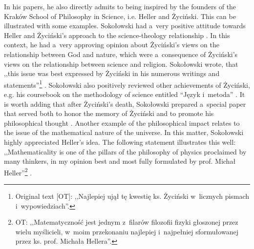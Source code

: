 \documentclass[%
  manuscript=article,
  year=2024,
  volume=77,
  doi=00000.000,
]{zfn}
\begin{document}
In his papers, he also directly admits to being inspired by the founders of the Kraków School of Philosophy in Science, i.e. Heller and Życiński. This can be illustrated with some examples. Sokołowski had a~very positive attitude towards Heller and Życiński's approach to the science-theology relationship 
\parencite[][]{}. %
 In this context, he had a~very approving opinion about Życiński's views on the relationship between God and nature, which were a~consequence of Życiński's views on the relationship between science and religion. Sokołowski wrote, that ,,this issue was best expressed by Życiński in his numerous writings and statements''\footnote{Original text [OT]: ,,Najlepiej ujął tę kwestię ks. Życiński w~licznych pismach i~wypowiedziach''.} 
\parencite[][p.187]{}. %
 Sokołowski also positively reviewed other achievements of Życiński, e.g. his coursebook on the methodology of science entitled ``Język i~metoda'' 
\parencite[][]{}. %
 It is worth adding that after Życiński's death, Sokołowski prepared a~special paper that served both to honor the memory of Życiński and to promote his philosophical thought 
\parencite[][]{}. %
 Another example of the philosophical impact relates to the issue of the mathematical nature of the universe. In this matter, Sokołowski highly appreciated Heller's idea. The following statement illustrates this well: ,,Mathematicality is one of the pillars of the philosophy of physics proclaimed by many thinkers, in my opinion best and most fully formulated by prof. Michał Heller''\footnote{OT: ,,Matematyczność jest jednym z~filarów filozofii fizyki głoszonej przez wielu myślicieli, w~moim przekonaniu najlepiej i~najpełniej sformułowanej przez ks. prof. Michała Hellera''.} 
\parencite[][p.47]{}.%
\end{document}
